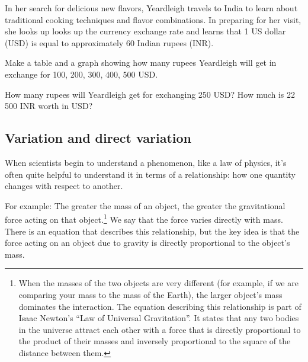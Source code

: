 
\begin{boxexplore}
In her search for delicious new flavors, Yeardleigh travels to India to learn about traditional cooking techniques and flavor combinations. In preparing for her visit, she looks up looks up the currency exchange rate and learns that 1 US dollar (USD) is equal to approximately 60 Indian rupees (INR).

Make a table and a graph showing how many rupees Yeardleigh will get in exchange for 100, 200, 300, 400, 500 USD.

How many rupees will Yeardleigh get for exchanging 250 USD? How much is 22\,500 INR worth in USD?
\end{boxexplore} %


\subsection{Variation and direct variation}

When scientists begin to understand a phenomenon, like a law of physics, it's often quite helpful to understand it in terms of a relationship: how one quantity changes with respect to another.

For example: The greater the mass of an object, the greater the gravitational force acting on that object.\footnote{When the masses of the two objects are very different (for example, if we are comparing your mass to the mass of the Earth), the larger object's mass dominates the interaction. The equation describing this relationship is part of Isaac Newton's ``Law of Universal Gravitation''. It states that any two bodies in the universe attract each other with a force that is directly proportional to the product of their masses and inversely proportional to the square of the distance between them.} We say that the force varies directly with mass. There is an equation that describes this relationship, but the key idea is that the force acting on an object due to gravity is directly proportional to the object's mass.

